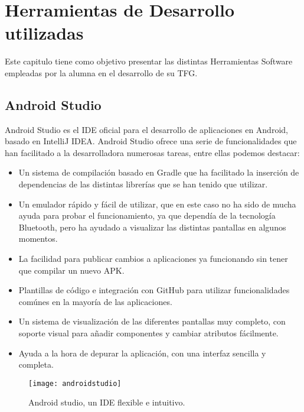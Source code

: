 %
%
%


\chapter{Herramientas de Desarrollo utilizadas} \label{chap:HerramientasSoftware}

Este capitulo tiene como objetivo presentar las distintas Herramientas Software empleadas por la alumna en el desarrollo de su TFG.

\section{Android Studio}

Android Studio es el IDE oficial para el desarrollo de aplicaciones en Android, basado en IntelliJ IDEA. Android Studio ofrece una serie de funcionalidades que han facilitado a la desarrolladora numerosas tareas, entre ellas podemos destacar:


\begin{itemize}
\item Un sistema de compilación basado en Gradle que ha facilitado la inserción de dependencias de las distintas librerías que se han tenido que utilizar.
\item Un emulador rápido y fácil de utilizar, que en este caso no ha sido de mucha ayuda para probar el funcionamiento, ya que dependía de la tecnología Bluetooth, pero ha ayudado a visualizar las distintas pantallas en algunos momentos.
\item La facilidad para publicar cambios a aplicaciones ya funcionando sin tener que compilar un nuevo APK.
\item Plantillas de código e integración con GitHub para utilizar funcionalidades comúnes en la mayoría de las aplicaciones.
\item Un sistema de visualización de las diferentes pantallas muy completo, con soporte visual para añadir componentes y cambiar atributos fácilmente.
\item Ayuda a la hora de depurar la aplicación, con una interfaz sencilla y completa.
\end{itemize} 

\begin{figure}[h]
	\centering
	\texttt{[image: androidstudio]}
	\caption{Android studio, un IDE flexible e intuitivo.}
	\label{fig:androidstudio}
\end{figure}

